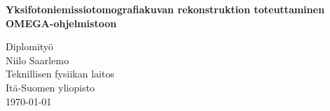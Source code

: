 \begin{titlepage}
    \vspace*{2.1in}
    \begin{center}
        \begin{spacing}{2}
        \textbf{
            \Huge Yksifotoniemissiotomografiakuvan rekonstruktion toteuttaminen OMEGA-ohjelmistoon
        }
        \end{spacing}
    \end{center}
    \vspace*{\fill}
    
    \hspace{.5\textwidth}\parbox{.5\textwidth}{
        Diplomityö
        \vspace*{1pt}\\%
        Niilo Saarlemo
        \vspace*{1pt}\\%
        Teknillisen fysiikan laitos
        \vspace*{1pt}\\%
        Itä-Suomen yliopisto
        \vspace*{1pt}\\%
        \today{}
    }
\end{titlepage}